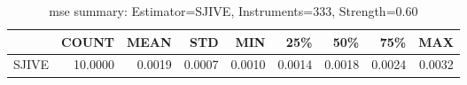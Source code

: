 \begin{table}[ht]
\centering
\caption{mse summary: Estimator=SJIVE, Instruments=333, Strength=0.60}
\begin{tabular}{lrrrrrrrr}
\toprule
 & COUNT & MEAN & STD & MIN & 25\% & 50\% & 75\% & MAX \\
\midrule
SJIVE & 10.0000 & 0.0019 & 0.0007 & 0.0010 & 0.0014 & 0.0018 & 0.0024 & 0.0032 \\
\bottomrule
\end{tabular}
\end{table}
